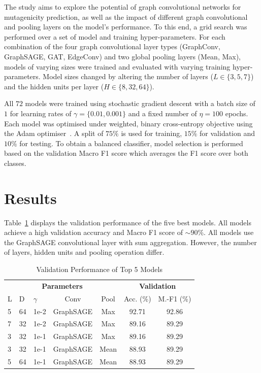 \documentclass[10pt,conference,compsocconf]{ieee}
\begin{document}
The study aims to explore the potential of graph convolutional networks for
mutagenicity prediction, as well as the impact of different graph convolutional
and pooling layers on the model's performance. To this end, a grid search was
performed over a set of model and training hyper-parameters. For each
combination of the four graph convolutional layer types (GraphConv, GraphSAGE,
GAT, EdgeConv) and two global pooling layers (Mean, Max), models of varying
sizes were trained and evaluated with varying training hyper-parameters. Model
sizes changed by altering the number of layers ($L \in \{3, 5, 7\}$) and the
hidden units per layer ($H \in \{8, 32, 64\}$). 

All $72$ models were trained using stochastic gradient descent with a batch size
of $1$ for learning rates of $\gamma=\{0.01, 0.001\}$ and a fixed number of
$\eta=100$ epochs. Each model was optimised under weighted, binary cross-entropy
objective using the Adam optimiser~\cite{adam}. A split of $75\%$ is used for
training, $15\%$ for validation and $10\%$ for testing. To obtain a balanced
classifier, model selection is performed based on the validation Macro F1 score
which averages the F1 score over both classes.

\section{Results}

Table~\ref{tab:top5} displays the validation performance of the five best
models. All models achieve a high validation accuracy and Macro F1 score of 
$\sim 90\%$. All models use the GraphSAGE convolutional layer with sum
aggregation. However, the number of layers, hidden units and pooling operation
differ. 

\begin{table}[ht]
  \centering
  \begin{tabular}{lllcccc}
    \toprule
    \multicolumn{5}{c}{\textbf{Parameters}} &
    \multicolumn{2}{c}{\textbf{Validation}} \\
    L & D & $\gamma$ & Conv & Pool & Acc. (\%) & M.-F1 (\%) \\
    \midrule
    5 & 64 & 1e-2 & GraphSAGE & Max & 92.71 & 92.86 \\
    7 & 32 & 1e-2 & GraphSAGE & Max & 89.16 & 89.29 \\
    3 & 32 & 1e-1 & GraphSAGE & Max & 89.16 & 89.29 \\
    3 & 32 & 1e-1 & GraphSAGE & Mean & 88.93 & 89.29 \\
    5 & 64 & 1e-1 & GraphSAGE & Mean & 88.93 & 89.29 \\
    \bottomrule
  \end{tabular}
  \caption{Validation Performance of Top 5 Models}
  \label{tab:top5}
\end{table}
\end{document}
